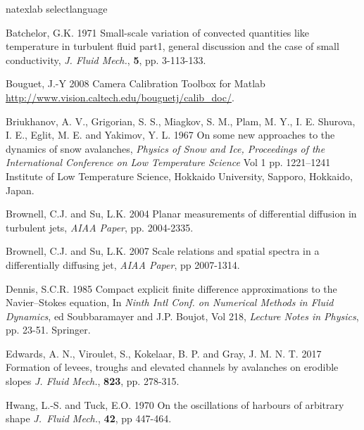 \documentclass[lineno]{jfm}
\begin{document}
{\begin{thebibliography}{99}

\expandafter\ifx\csname natexlab\endcsname\relax
\def\natexlab#1{#1}\fi
\expandafter\ifx\csname selectlanguage\endcsname\relax
\def\selectlanguage#1{\relax}\fi

{\sc Batchelor, G.K.} 1971 {Small-scale variation of convected quantities like temperature in turbulent fluid part1, general discussion and the case of small conductivity}, {\it J. Fluid Mech.}, {\bf 5}, pp. 3-113-133.

{\sc Bouguet, J.-Y} 2008 Camera Calibration Toolbox for Matlab {\url{http://www.vision.caltech.edu/bouguetj/calib_doc/}}.

{\sc Briukhanov, A. V.,   Grigorian, S. S., Miagkov,  S. M., Plam, M. Y.,   I. E. Shurova, I. E.,   Eglit, M. E. and Yakimov, Y. L.} 1967
{On some new approaches to the dynamics of snow avalanches},
{\it Physics of Snow and Ice,  Proceedings of the International Conference on Low Temperature Science}
{Vol 1} pp. 1221--1241 {Institute of Low Temperature Science, Hokkaido University, Sapporo, Hokkaido, Japan}.

 {\sc Brownell,  C.J.  and Su,  L.K.} 2004  {Planar measurements of differential diffusion in turbulent jets}, {\it AIAA Paper},  pp. 2004-2335.

  {\sc Brownell, C.J. and  Su, L.K.} 2007 {Scale relations and spatial spectra in a differentially diffusing jet}, {\it AIAA Paper}, pp 2007-1314.

 {\sc  Dennis, S.C.R.} 1985 {Compact explicit finite difference approximations to the Navier--Stokes equation},  { In \it Ninth Intl Conf. on Numerical Methods in Fluid Dynamics},  {ed Soubbaramayer and J.P. Boujot},  {Vol 218}, {\it Lecture Notes in Physics}, pp. 23-51. Springer.

{\sc Edwards, A. N., Viroulet, S., Kokelaar, B. P. and Gray, J. M. N. T.} 2017 Formation of levees, troughs and elevated channels by avalanches on erodible slopes {\it J. Fluid Mech.}, {\bf 823}, pp. 278-315.

 {\sc Hwang,  L.-S.  and  Tuck, E.O.} 1970 On the oscillations of harbours of arbitrary shape {\it J.~Fluid Mech.}, {\bf42}, pp 447-464.


\end{thebibliography}}
\end{document}
